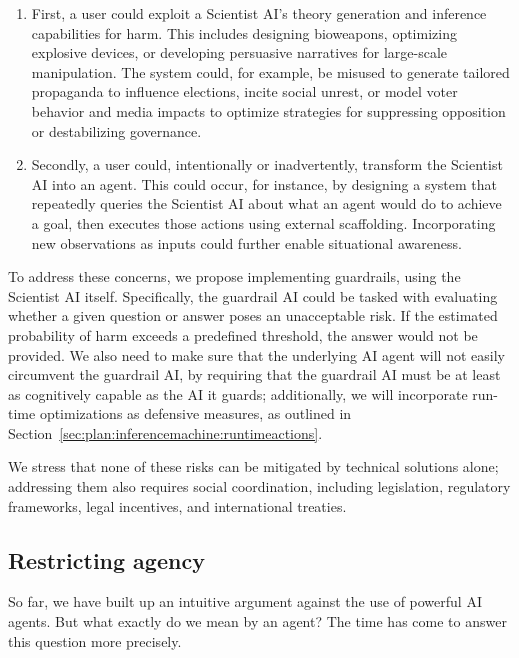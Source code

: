 \begin{enumerate}
   \item First, a user could exploit a Scientist AI’s theory generation and inference capabilities for harm. This includes designing bioweapons, optimizing explosive devices, or developing persuasive narratives for large-scale manipulation. The system could, for example, be misused to generate tailored propaganda to influence elections, incite social unrest, or model voter behavior and media impacts to optimize strategies for suppressing opposition or destabilizing governance.
   
   \item Secondly, a user could, intentionally or inadvertently, transform the Scientist AI into an agent. This could occur, for instance, by designing a system that repeatedly queries the Scientist AI about what an agent would do to achieve a goal, then executes those actions using external scaffolding. Incorporating new observations as inputs could further enable situational awareness. 
\end{enumerate}

To address these concerns, we propose implementing guardrails, using the Scientist AI itself. Specifically, the guardrail AI could be tasked with evaluating whether a given question or answer poses an unacceptable risk. If the estimated probability of harm exceeds a predefined threshold, the answer would not be provided.
We also need to make sure that the underlying AI agent will not easily circumvent the guardrail AI, by requiring that the guardrail AI must be at least as cognitively capable as the AI it guards; additionally, we will incorporate run-time optimizations as defensive measures, as outlined in Section~\ref{sec:plan:inferencemachine:runtimeactions}.

We stress that none of these risks can be mitigated by technical solutions alone; addressing them also requires social coordination, including legislation, regulatory frameworks, legal incentives, and international treaties.

\subsection{Restricting agency}
\label{sec:plan:restricting}

So far, we have built up an intuitive argument against the use of powerful AI agents. But what exactly do we mean by an agent? The time has come to answer this question more precisely.

